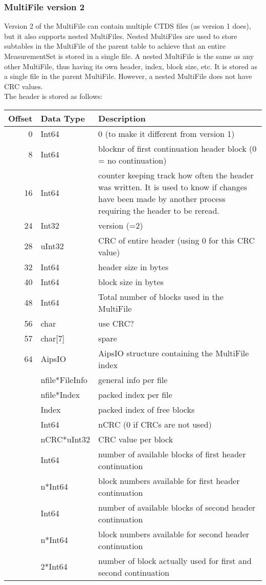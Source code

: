 \subsubsection{MultiFile version 2}
Version 2 of the MultiFile can contain multiple CTDS files (as version
1 does), but it also
supports nested MultiFiles. Nested MultiFiles are used to store
subtables in the MultiFile of the parent table to achieve that an
entire MeasurementSet is stored in a single file. A nested MultiFile is
the same as any other MultiFile, thus having its own header, index,
block size, etc.  It is stored as a single file in the parent MultiFile.
However, a nested MultiFile does not have CRC values.
\\The header is stored as follows:

\vspace{0.15in}
\begin{tabular}{|r|l|p{12cm}|} \hline
  Offset & Data Type & Description \\ \hline\hline
  0 & Int64 & 0  (to make it different from version 1) \\
  8 & Int64 & blocknr of first continuation header block (0 = no continuation) \\
  16 & Int64 & counter keeping track how often the header was written. It
          is used to know if changes have been made by another process
          requiring the header to be reread. \\
  24 & Int32 & version (=2) \\
  28 & uInt32 & CRC of entire header (using 0 for this CRC value) \\
  32 & Int64 & header size in bytes \\
  40 & Int64 & block size in bytes \\
  48 & Int64 & Total number of blocks used in the MultiFile \\
  56 & char & use CRC? \\
  57 & char[7] & spare \\
  64 & AipsIO & AipsIO structure containing the MultiFile index \\
       & nfile*FileInfo & general info per file \\
       & nfile*Index & packed index per file \\
       & Index & packed index of free blocks \\
       & Int64 & nCRC (0 if CRCs are not used) \\
       & nCRC*uInt32 & CRC value per block \\
       & Int64 & number of available blocks of first header continuation \\
       & n*Int64 & block numbers available for first header continuation \\
       & Int64 & number of available blocks of second header continuation \\
       & n*Int64 & block numbers available for second header continuation \\
       & 2*Int64 & number of block actually used for first and second continuation \\
  \hline
\end{tabular}
\vspace{0.15in}


